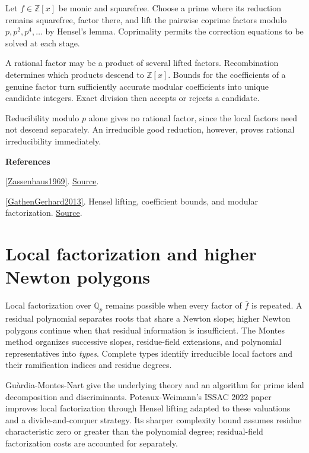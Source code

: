 \documentclass[11pt,a4paper,oneside,openany]{book}
\newenvironment{sources}{\par\smallskip\begingroup\footnotesize\color{atlasgray}\leftskip=10pt\setlength{\parskip}{2pt}}{\par\endgroup\smallskip}
\begin{document}
\color{black} Let \(f\in\mathbb Z[x]\) be monic and squarefree. Choose a prime where its reduction remains squarefree, factor there, and lift the pairwise coprime factors modulo \(p,p^2,p^4,\ldots\) by Hensel's lemma. Coprimality permits the correction equations to be solved at each stage.\par
\color{black} A rational factor may be a product of several lifted factors. Recombination determines which products descend to \(\mathbb Z[x]\). Bounds for the coefficients of a genuine factor turn sufficiently accurate modular coefficients into unique candidate integers. Exact division then accepts or rejects a candidate.\par
\color{black} Reducibility modulo \(p\) alone gives no rational factor, since the local factors need not descend separately. An irreducible good reduction, however, proves rational irreducibility immediately.\par
\begin{sources}
\textbf{References}\par\smallskip
\noindent\hyperlink{ref:Zassenhaus1969}{[Zassenhaus1969]}.  \href{https://doi.org/10.1016/0022-314X(69)90047-X}{Source}.\par
\noindent\hyperlink{ref:GathenGerhard2013}{[GathenGerhard2013]}. Hensel lifting, coefficient bounds, and modular factorization. \href{https://doi.org/10.1017/CBO9781139856065}{Source}.\par
\end{sources}\color{black}
\section{Local factorization and higher Newton polygons}
\color{black} Local factorization over \(\mathbb Q_p\) remains possible when every factor of \(\bar f\) is repeated. A residual polynomial separates roots that share a Newton slope; higher Newton polygons continue when that residual information is insufficient. The Montes method organizes successive slopes, residue-field extensions, and polynomial representatives into \emph{types}. Complete types identify irreducible local factors and their ramification indices and residue degrees.\par
\color{black} Guàrdia-Montes-Nart give the underlying theory and an algorithm for prime ideal decomposition and discriminants. Poteaux-Weimann's ISSAC 2022 paper improves local factorization through Hensel lifting adapted to these valuations and a divide-and-conquer strategy. Its sharper complexity bound assumes residue characteristic zero or greater than the polynomial degree; residual-field factorization costs are accounted for separately.\par
\end{document}
